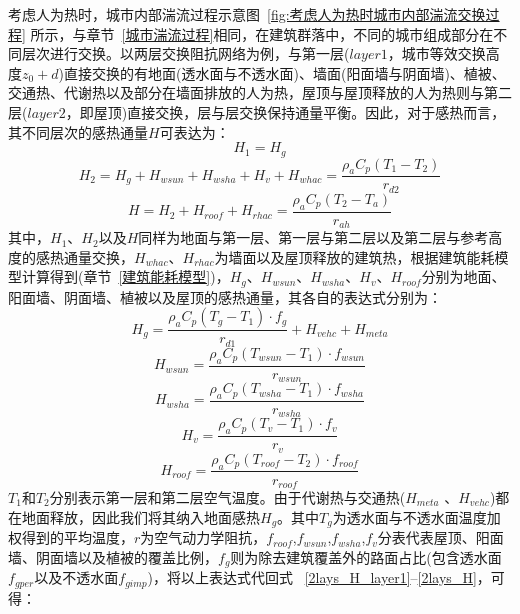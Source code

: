 考虑人为热时，城市内部湍流过程示意图~\ref{fig:考虑人为热时城市内部湍流交换过程} 所示，与章节~\ref{城市湍流过程}相同，在建筑群落中，不同的城市组成部分在不同层次进行交换。以两层交换阻抗网络为例，与第一层($layer1$，城市等效交换高度$z_0+d$)直接交换的有地面(透水面与不透水面)、墙面(阳面墙与阴面墙)、植被、交通热、代谢热以及部分在墙面排放的人为热，屋顶与屋顶释放的人为热则与第二层($layer2$，即屋顶)直接交换，层与层交换保持通量平衡。因此，对于感热而言，其不同层次的感热通量$H$可表达为：
\begin{equation}\label{2lays_H_layer1}
    H_{1} = H_{g}
\end{equation}
%
\begin{equation}\label{2lays_H_layer2}
    H_{2} = H_{g} + H_{wsun} + H_{wsha} + H_{v} + H_{whac} = \frac{\rho _a C_p \left( T_{1} - T_{2} \right)}{r_{d2}}
\end{equation}
%
\begin{equation}\label{2lays_H}
    H = H_{2} + H_{roof} + H_{rhac} = \frac{\rho _a C_p \left( T_{2} - T_a \right)}{r_{ah}}
\end{equation}
其中，$H_1$、$H_2$以及$H$同样为地面与第一层、第一层与第二层以及第二层与参考高度的感热通量交换，$H_{whac}$、$H_{rhac}$为墙面以及屋顶释放的建筑热，根据建筑能耗模型计算得到(章节~\ref{建筑能耗模型})，$H_{g}$、$H_{wsun}$、$H_{wsha}$、$H_{v}$、$H_{roof}$分别为地面、阳面墙、阴面墙、植被以及屋顶的感热通量，其各自的表达式分别为：
\begin{equation}\label{urban_Hg}
    H_{g} = \frac{\rho _a C_p \left( T_{g} - T_{1} \right) \cdot f_{g}}{r_{d1}} + H_{vehc} + H_{meta}
\end{equation}
%
\begin{equation}
    H_{wsun} = \frac{\rho  _a C_p \left( T_{wsun} - T_{1} \right) \cdot f_{wsun}}{r_{wsun}}
\end{equation}
%
\begin{equation}
    H_{wsha} = \frac{\rho _a C_p \left( T_{wsha} - T_{1} \right) \cdot f_{wsha}}{r_{wsha}}
\end{equation}
%
\begin{equation}
    H_{v} = \frac{\rho _a C_p \left( T_{v} - T_{1} \right) \cdot f_v}{r_{v}}
\end{equation}
%
\begin{equation}\label{urban_Hroof}
    H_{roof} = \frac{\rho _a C_p \left( T_{roof} - T_{2} \right) \cdot f_{roof}}{r_{roof}}
\end{equation}
$T_1$和$T_2$分别表示第一层和第二层空气温度。由于代谢热与交通热($H_{meta}$ 、$H_{vehc}$)都在地面释放，因此我们将其纳入地面感热$H_{g}$。其中$T_{g}$为透水面与不透水面温度加权得到的平均温度，$r$为空气动力学阻抗，\allowbreak $f_{roof}$,\allowbreak  $f_{wsun}$,\allowbreak  $f_{wsha}$,\allowbreak  $f_v$分表代表屋顶、阳面墙、阴面墙以及植被的覆盖比例，$f_{g}$则为除去建筑覆盖外的路面占比(包含透水面$f_{gper}$以及不透水面$f_{gimp}$)，将以上表达式代回式 ~\ref{2lays_H_layer1}--\ref{2lays_H}，可得：

